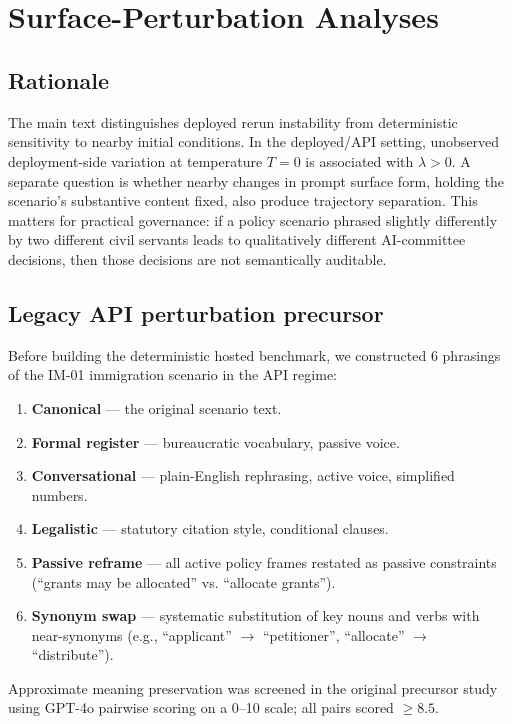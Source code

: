 \documentclass[11pt,onecolumn]{article}
\newcommand{\lam}{\ensuremath{\hat{\lambda}}}
\begin{document}
\section{Surface-Perturbation Analyses}
\label{sec:S4-semantic}

\subsection{Rationale}

The main text distinguishes deployed rerun instability from deterministic
sensitivity to nearby initial conditions. In the deployed/API setting,
unobserved deployment-side variation at temperature $T = 0$ is associated with
$\lam > 0$. A separate question is whether nearby changes in prompt surface
form, holding the scenario's substantive content fixed, also produce
trajectory separation. This matters for practical governance: if a policy
scenario phrased slightly differently by two different civil servants leads to
qualitatively different AI-committee decisions, then those decisions are not
semantically auditable.

\subsection{Legacy API perturbation precursor}

Before building the deterministic hosted benchmark, we constructed 6 phrasings
of the IM-01 immigration scenario in the API regime:
\begin{enumerate}[noitemsep]
  \item \textbf{Canonical} --- the original scenario text.
  \item \textbf{Formal register} --- bureaucratic vocabulary, passive voice.
  \item \textbf{Conversational} --- plain-English rephrasing, active voice,
        simplified numbers.
  \item \textbf{Legalistic} --- statutory citation style, conditional clauses.
  \item \textbf{Passive reframe} --- all active policy frames restated as
        passive constraints (``grants may be allocated'' vs. ``allocate grants'').
  \item \textbf{Synonym swap} --- systematic substitution of key nouns and
        verbs with near-synonyms (e.g., ``applicant'' $\to$ ``petitioner'',
        ``allocate'' $\to$ ``distribute'').
\end{enumerate}
Approximate meaning preservation was screened in the original precursor study
using GPT-4o pairwise scoring on a 0--10 scale; all pairs scored $\geq 8.5$.
\end{document}
